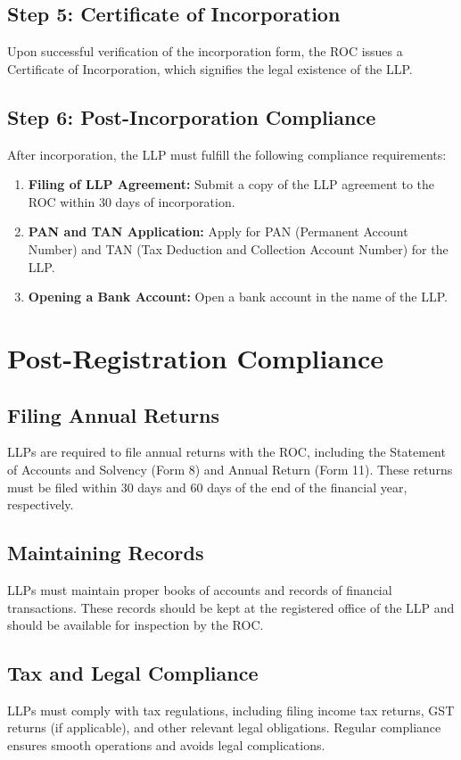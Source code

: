 \documentclass[a4paper,12pt]{report}
\begin{document}
\section{Step 5: Certificate of Incorporation}
Upon successful verification of the incorporation form, the ROC issues a Certificate of Incorporation, which signifies the legal existence of the LLP.

\section{Step 6: Post-Incorporation Compliance}
After incorporation, the LLP must fulfill the following compliance requirements:
\begin{enumerate}
    \item \textbf{Filing of LLP Agreement:} Submit a copy of the LLP agreement to the ROC within 30 days of incorporation.
    \item \textbf{PAN and TAN Application:} Apply for PAN (Permanent Account Number) and TAN (Tax Deduction and Collection Account Number) for the LLP.
    \item \textbf{Opening a Bank Account:} Open a bank account in the name of the LLP.
\end{enumerate}

\chapter{Post-Registration Compliance}
\section{Filing Annual Returns}
LLPs are required to file annual returns with the ROC, including the Statement of Accounts and Solvency (Form 8) and Annual Return (Form 11). These returns must be filed within 30 days and 60 days of the end of the financial year, respectively.

\section{Maintaining Records}
LLPs must maintain proper books of accounts and records of financial transactions. These records should be kept at the registered office of the LLP and should be available for inspection by the ROC.

\section{Tax and Legal Compliance}
LLPs must comply with tax regulations, including filing income tax returns, GST returns (if applicable), and other relevant legal obligations. Regular compliance ensures smooth operations and avoids legal complications.
\end{document}
